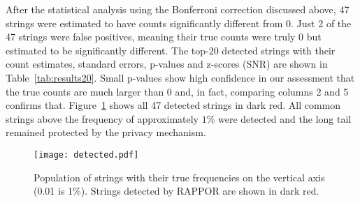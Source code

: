 \documentclass{sig-alternate-2013}
\newcommand\RAPPOR{{RAPPOR}}
\begin{document}
After the statistical analysis using the Bonferroni correction discussed above, 47 strings were estimated to have counts significantly different from 0. Just 2 of the 47 strings were false positives, meaning their true counts were truly 0 but estimated to be significantly different. The top-20 detected strings with their count estimates, standard errors, p-values and z-scores (SNR) are shown in Table~\ref{tab:results20}. Small p-values show high confidence in our assessment that the true counts are much larger than 0 and, in fact, comparing columns 2 and 5 confirms that. Figure~\ref{fig:detected} shows all 47 detected strings in dark red. All common strings above the frequency of approximately $1\%$ were detected and the long tail remained protected by the privacy mechanism.

\begin{figure}[!t]
\centering
\texttt{[image: detected.pdf]}
\caption{Population of strings with their true frequencies on the vertical axis (0.01 is 1\%). Strings detected by \RAPPOR{} are shown in dark red.}
\label{fig:detected}
\end{figure}
\end{document}
